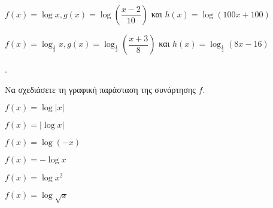 \documentclass[11pt,a4paper,twocolumn]{article}
\newcounter{askhsh}
\newcommand{\askhsh}{{\large\theaskhsh.}\ \addtocounter{askhsh}{1}}
\begin{document}
\begin{alist}
\item $f(x)=\log{x},g(x)=\log{\left(\dfrac{x-2}{10}\right)}$ και $h(x)=\log{\left(100x+100\right)}$
\item $f(x)=\log_{\frac{1}{2}}{x},g(x)=\log_{\frac{1}{2}}{\left(\dfrac{x+3}{8}\right)}$ και $h(x)=\log_{\frac{1}{2}}{(8x-16)}$
\end{alist}
\askhsh Να σχεδιάσετε τη γραφική παράσταση της συνάρτησης $f$.
\begin{multicols}{2}
\begin{alist}
\item $f(x)=\log{|x|}$
\item $f(x)=|\log{x}|$
\item $f(x)=\log{(-x)}$
\item $f(x)=-\log{x}$
\item $f(x)=\log{x^2}$
\item $f(x)=\log{\sqrt{x}}$
\end{alist}
\end{multicols}
\end{document}
